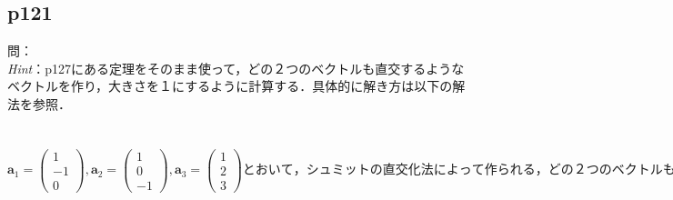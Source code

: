 \documentclass[dvipdfmx,uplatex,11pt]{jsarticle}
\begin{document}
\subsection{p121}
問：\\
\textsl{Hint}：p127にある定理をそのまま使って，どの２つのベクトルも直交するようなベクトルを作り，大きさを１にするように計算する．具体的に解き方は以下の解法を参照．\\
\dotfill \\ \\
$\bm{a}_1=
\begin{pmatrix}
1 \\
-1 \\
0
\end{pmatrix}
,\bm{a}_2=
\begin{pmatrix}
1 \\
0 \\
-1
\end{pmatrix}
,\bm{a}_3=
\begin{pmatrix}
1 \\
2 \\
3
\end{pmatrix}
とおいて，シュミットの直交化法によって作られる，どの２つのベクトルも直交するようなベクトルを\bm{b}_1, \bm{b}_2, \bm{b}_3 ，正規直交基底を\bm{c}_1, \bm{c}_2, \bm{c}_3 とする．$
\end{document}
